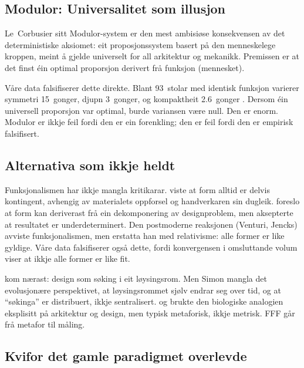 \documentclass[12pt,a4paper]{article}
\begin{document}
\subsection{Modulor: Universalitet som illusjon}

Le~Corbusier sitt Modulor-system \citep{corbusier1950} er den mest ambisi\o{}se konsekvensen av det deterministiske aksiomet: eit proposjonssystem basert p\aa{} den menneskelege kroppen, meint \aa{} gjelde universelt for all arkitektur og mekanikk. Premissen er at det finst \'{e}in optimal proporsjon derivert fr\aa{} funksjon (mennesket).

V\aa{}re data falsifiserer dette direkte. Blant 93~stolar med identisk funksjon varierer symmetri 15~gonger, djupn 3~gonger, og kompaktheit 2.6~gonger \citep{finne2026d}. Dersom \'{e}in universell proporsjon var optimal, burde variansen v\ae{}re null. Den er enorm. Modulor er ikkje feil fordi den er ein forenkling; den er feil fordi den er empirisk falsifisert.

\subsection{Alternativa som ikkje heldt}

Funksjonalismen har ikkje mangla kritikarar. \citet{pye1968} viste at form alltid er delvis kontingent, avhengig av materialets oppforsel og handverkaren sin dugleik. \citet{alexander1964} foreslo at form kan deriverast fr\aa{} ein dekomponering av designproblem, men aksepterte at resultatet er underdeterminert. Den postmoderne reaksjonen (Venturi, Jencks) avviste funksjonalismen, men erstatta han med relativisme: alle former er like gyldige. V\aa{}re data falsifiserer ogs\aa{} dette, fordi konvergensen i omsluttande volum \citep{finne2026b} viser at ikkje alle former er like fit.

\citet{simon1996} kom n\ae{}rast: design som s\o{}king i eit l\o{}ysingsrom. Men Simon mangla det evolusjon\ae{}re perspektivet, at l\o{}ysingsrommet sj\o{}lv endrar seg over tid, og at \enquote{s\o{}kinga} er distribuert, ikkje sentralisert. \citet{frazer1995} og \citet{steadman2008} brukte den biologiske analogien eksplisitt p\aa{} arkitektur og design, men typisk metaforisk, ikkje metrisk. FFF g\aa{}r fr\aa{} metafor til m\aa{}ling.

\subsection{Kvifor det gamle paradigmet overlevde}
\end{document}
